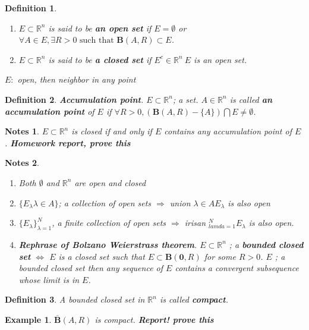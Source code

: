 \documentclass[a4paper,10pt]{article}
\newtheorem{defi}{Definition}
\newtheorem{ex}{Example}
\newtheorem{note}{Notes}
\newcommand{\R}{\mathbb{R}}
\begin{document}
\begin{defi}
	\begin{enumerate}
		\item $ E \subset \R^n $ is said to be \textbf{an open set} if $ E = \emptyset $ or $ \forall A \in E , \exists R>0 \text{ such that } \mathbf{B}(A,R) \subset E $.
		\item $ E \subset \R^n $ is said to be \textbf{a closed set} if $ E^{c} \in \R^n \ E $ is an open set.
	\end{enumerate}
	$ E : $ open, then neighbor in any point %
\end{defi}

\begin{defi}
	\textbf{Accumulation point}. $ E \subset \R^n $; a set. $ A \in \R^n $ is called \textbf{an accumulation point} of $ E $ if $ \forall R>0, (\mathbf{B}(A,R)-\{A\}) \bigcap E \neq \emptyset $.
\end{defi}

\begin{note}
	$ E \subset \R^n $ is closed if and only if $ E $ contains any accumulation point of $ E $ . \textbf{Homework report, prove this}
\end{note}

\begin{note}
	\begin{enumerate}
		\item Both $ \emptyset $ and $ \R^n $ are open and closed
		\item $ \{E_{\lambda}\lambda \in A \} $; a collection of open sets $ \Rightarrow $ union $ \lambda \in A E_{\lambda} $ is also open 
		\item $ \{E_{\lambda}\}_{\lambda=1}^{N} $, a finite collection of open sets $ \Rightarrow $ irisan $ _{lamda=1}^{N} E_{\lambda} $ is also open.
		\item  \textbf{Rephrase of Bolzano Weierstrass theorem}. $ E \subset \R^n $ ; a \textbf{bounded closed set} $ \Leftrightarrow $ $ E $ is a closed set such that $ E \subset \mathbf{B}(\mathbf{0},R) $ for some $ R>0 $. $ E $ ; a bounded closed set then any sequence of $ E $ contains a convergent subsequence whose limit is in $ E $.
	\end{enumerate}
\end{note}

\begin{defi}
	A bounded closed set in $ \R^n $ is called \textbf{compact}.
\end{defi}

\begin{ex}
	$ \overline{\mathbf{B}}(A,R) $ is compact. \textbf{Report! prove this}
\end{ex}
\end{document}
